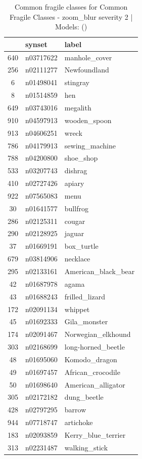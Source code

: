 \begin{table}
\caption{Common fragile classes for Common Fragile Classes - zoom_blur severity 2 | Models: ()}
\label{tab:Common Fragile Classes - zoom_blur severity 2_d41d8cd9}
\begin{tabular}{cll}
\toprule
 & synset & label \\
\midrule
640 & n03717622 & manhole_cover \\
256 & n02111277 & Newfoundland \\
6 & n01498041 & stingray \\
8 & n01514859 & hen \\
649 & n03743016 & megalith \\
910 & n04597913 & wooden_spoon \\
913 & n04606251 & wreck \\
786 & n04179913 & sewing_machine \\
788 & n04200800 & shoe_shop \\
533 & n03207743 & dishrag \\
410 & n02727426 & apiary \\
922 & n07565083 & menu \\
30 & n01641577 & bullfrog \\
286 & n02125311 & cougar \\
290 & n02128925 & jaguar \\
37 & n01669191 & box_turtle \\
679 & n03814906 & necklace \\
295 & n02133161 & American_black_bear \\
42 & n01687978 & agama \\
43 & n01688243 & frilled_lizard \\
172 & n02091134 & whippet \\
45 & n01692333 & Gila_monster \\
174 & n02091467 & Norwegian_elkhound \\
303 & n02168699 & long-horned_beetle \\
48 & n01695060 & Komodo_dragon \\
49 & n01697457 & African_crocodile \\
50 & n01698640 & American_alligator \\
305 & n02172182 & dung_beetle \\
428 & n02797295 & barrow \\
944 & n07718747 & artichoke \\
183 & n02093859 & Kerry_blue_terrier \\
313 & n02231487 & walking_stick \\

\end{tabular}
\end{table}
